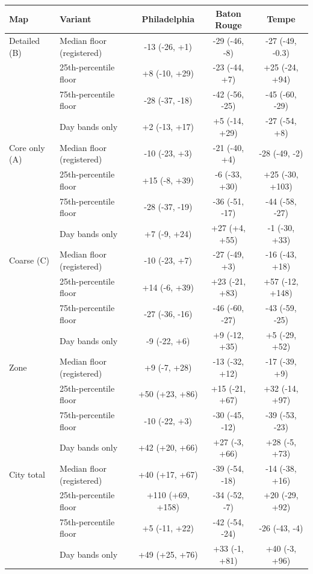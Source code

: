 \begin{tabular}{llccc}
\toprule
Map & Variant & Philadelphia & Baton Rouge & Tempe \\
\midrule
Detailed (B) & Median floor (registered) & -13 (-26, +1) & -29 (-46, -8) & -27 (-49, -0.3) \\
 & 25th-percentile floor & +8 (-10, +29) & -23 (-44, +7) & +25 (-24, +94) \\
 & 75th-percentile floor & -28 (-37, -18) & -42 (-56, -25) & -45 (-60, -29) \\
 & Day bands only & +2 (-13, +17) & +5 (-14, +29) & -27 (-54, +8) \\
\midrule
Core only (A) & Median floor (registered) & -10 (-23, +3) & -21 (-40, +4) & -28 (-49, -2) \\
 & 25th-percentile floor & +15 (-8, +39) & -6 (-33, +30) & +25 (-30, +103) \\
 & 75th-percentile floor & -28 (-37, -19) & -36 (-51, -17) & -44 (-58, -27) \\
 & Day bands only & +7 (-9, +24) & +27 (+4, +55) & -1 (-30, +33) \\
\midrule
Coarse (C) & Median floor (registered) & -10 (-23, +7) & -27 (-49, +3) & -16 (-43, +18) \\
 & 25th-percentile floor & +14 (-6, +39) & +23 (-21, +83) & +57 (-12, +148) \\
 & 75th-percentile floor & -27 (-36, -16) & -46 (-60, -27) & -43 (-59, -25) \\
 & Day bands only & -9 (-22, +6) & +9 (-12, +35) & +5 (-29, +52) \\
\midrule
Zone & Median floor (registered) & +9 (-7, +28) & -13 (-32, +12) & -17 (-39, +9) \\
 & 25th-percentile floor & +50 (+23, +86) & +15 (-21, +67) & +32 (-14, +97) \\
 & 75th-percentile floor & -10 (-22, +3) & -30 (-45, -12) & -39 (-53, -23) \\
 & Day bands only & +42 (+20, +66) & +27 (-3, +66) & +28 (-5, +73) \\
\midrule
City total & Median floor (registered) & +40 (+17, +67) & -39 (-54, -18) & -14 (-38, +16) \\
 & 25th-percentile floor & +110 (+69, +158) & -34 (-52, -7) & +20 (-29, +92) \\
 & 75th-percentile floor & +5 (-11, +22) & -42 (-54, -24) & -26 (-43, -4) \\
 & Day bands only & +49 (+25, +76) & +33 (-1, +81) & +40 (-3, +96) \\
\midrule

\end{tabular}
